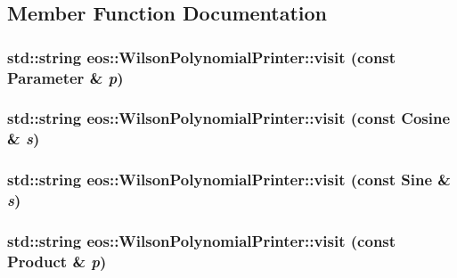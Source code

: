 \subsection{Member Function Documentation}
\hypertarget{classeos_1_1WilsonPolynomialPrinter_a9ea1405c94483cec63167db42823321b}{
\subsubsection[{visit}]{\setlength{\rightskip}{0pt plus 5cm}std::string eos::WilsonPolynomialPrinter::visit (const {\bf Parameter} \& {\em p})}}
\label{classeos_1_1WilsonPolynomialPrinter_a9ea1405c94483cec63167db42823321b}
\hypertarget{classeos_1_1WilsonPolynomialPrinter_a498347291642740249609a62270c4d81}{
\subsubsection[{visit}]{\setlength{\rightskip}{0pt plus 5cm}std::string eos::WilsonPolynomialPrinter::visit (const Cosine \& {\em s})}}
\label{classeos_1_1WilsonPolynomialPrinter_a498347291642740249609a62270c4d81}
\hypertarget{classeos_1_1WilsonPolynomialPrinter_a002e08bd6d795359f62df48e2439e978}{
\subsubsection[{visit}]{\setlength{\rightskip}{0pt plus 5cm}std::string eos::WilsonPolynomialPrinter::visit (const Sine \& {\em s})}}
\label{classeos_1_1WilsonPolynomialPrinter_a002e08bd6d795359f62df48e2439e978}
\hypertarget{classeos_1_1WilsonPolynomialPrinter_af1f56261d6e1fe1e9b78cf1f6f1c0555}{
\subsubsection[{visit}]{\setlength{\rightskip}{0pt plus 5cm}std::string eos::WilsonPolynomialPrinter::visit (const Product \& {\em p})}}
